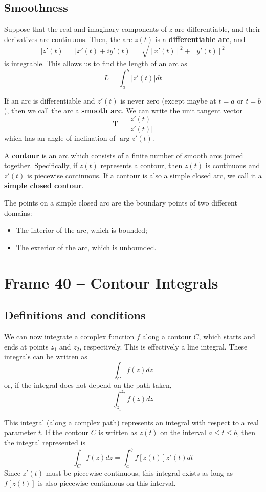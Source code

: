 \documentclass{article}
\renewcommand{\emph}{\textbf}
\begin{document}
\subsection{Smoothness}
Suppose that the real and imaginary components of $z$ are differentiable, and their derivatives are continuous. Then, the arc $z(t)$ is a \emph{differentiable arc}, and
\[
	|z'(t)| = |x'(t) + iy'(t)| = \sqrt{[x'(t)]^2 + [y'(t)]^2}
\]
is integrable. This allows us to find the length of an arc as
\[
	L = \int_a^b |z'(t)| dt
\]

If an arc is differentiable and $z'(t)$ is never zero (except maybe at $t = a$ or $t = b$), then we call the arc a \emph{smooth arc}. We can write the unit tangent vector
\[
	\mathbf{T} = \frac{z'(t)}{|z'(t)|}
\]
which has an angle of inclination of $\arg z'(t)$. 

A \emph{contour} is an arc which consists of a finite number of smooth arcs joined together. Specifically, if $z(t)$ represents a contour, then $z(t)$ is continuous and $z'(t)$ is piecewise continuous. If a contour is also a simple closed arc, we call it a \emph{simple closed contour}. 

The points on a simple closed arc are the boundary points of two different domains:
\begin{itemize}
	\item The interior of the arc, which is bounded;
	\item The exterior of the arc, which is unbounded.
\end{itemize}


\clearpage
\section{Frame 40 -- Contour Integrals}
\subsection{Definitions and conditions}
We can now integrate a complex function $f$ along a contour $C$, which starts and ends at points $z_1$ and $z_2$, respectively. This is effectively a line integral. These integrals can be written as
\[
	\int_C f(z) dz
\]
or, if the integral does not depend on the path taken,
\[
	\int_{z_1}^{z_2} f(z) dz
\]

This integral (along a complex path) represents an integral with respect to a real parameter $t$. If the contour $C$ is written as $z(t)$ on the interval $a \le t \le b$, then the integral represented is
\[
	\int_C f(z) dz = \int_a^b f[z(t)] z'(t) dt
\]
Since $z'(t)$ must be piecewise continuous, this integral exists as long as $f[z(t)]$ is also piecewise continuous on this interval.
\end{document}
